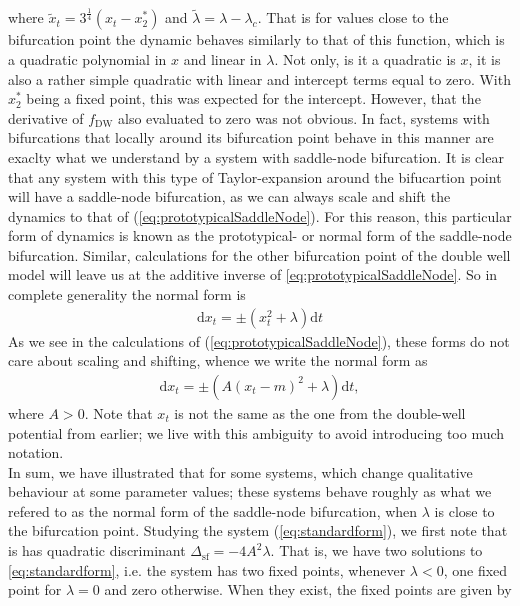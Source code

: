 where $\tilde{x}_t = 3^{\frac{1}{4}}\left(x_t-x_2^*\right)$ and  $\tilde{\lambda} = \lambda - \lambda_c$. That is for values close to the bifurcation point the dynamic behaves similarly to that of this function, which is a quadratic polynomial in $x$ and linear in $\lambda$. Not only, is it a quadratic is $x$, it is also a rather simple quadratic with linear and intercept terms equal to zero. With $x_2^*$ being a fixed point, this was expected for the intercept. However, that the derivative of $f_{\mathrm{DW}}$ also evaluated to zero was not obvious. In fact, systems with bifurcations that locally around its bifurcation point behave in this manner are exaclty what we understand by a system with saddle-node bifurcation. It is clear that any system with this type of Taylor-expansion around the bifucartion point will have a saddle-node bifurcation, as we can always scale and shift the dynamics to that of (\ref{eq:prototypicalSaddleNode}). For this reason, this particular form of dynamics is known as the prototypical- or normal form of the saddle-node bifurcation. Similar, calculations for the other bifurcation point of the double well model will leave us at the additive inverse of \ref{eq:prototypicalSaddleNode}. So in complete generality the normal form is
\begin{align}
    \mathrm{d}x_t = \pm\left(x_t^2 + \lambda\right)\mathrm{d}t
\end{align} 
As we see in the calculations of (\ref{eq:prototypicalSaddleNode}), these forms do not care about scaling and shifting, whence we write the normal form as
\begin{align}
    \mathrm{d}x_t = \pm\left(A\left(x_t - m\right)^2 + \lambda\right)\mathrm{d}t, \label{eq:standardform}
\end{align}
where $A>0$. Note that $x_t$ is not the same as the one from the double-well potential from earlier; we live with this ambiguity to avoid introducing too much notation.\\ In sum, we have illustrated that for some systems, which change qualitative behaviour at some parameter values; these systems behave roughly as what we refered to as the normal form of the saddle-node bifurcation, when $\lambda$ is close to the bifurcation point. Studying the system (\ref{eq:standardform}), we first note that is has quadratic discriminant $\Delta_{\mathrm{sf}} = -4A^2\lambda$. That is, we have two solutions to \ref{eq:standardform}, i.e. the system has two fixed points, whenever $\lambda<0$, one fixed point for $\lambda = 0$ and zero otherwise. When they exist, the fixed points are given by
